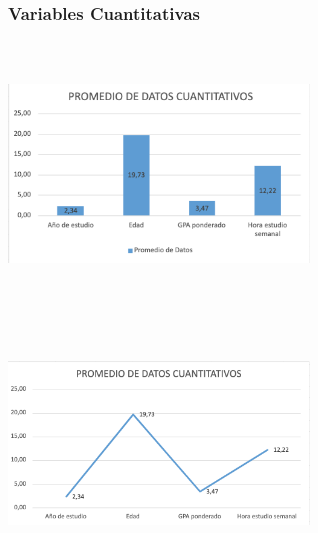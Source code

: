 \documentclass{article}
\begin{document}
\subsubsection*{Variables Cuantitativas}
\includegraphics[width=8cm, height=7cm]{histo}
\includegraphics[width=8cm, height=7cm]{poligono}\vspace{0.25cm}\\
\end{document}
